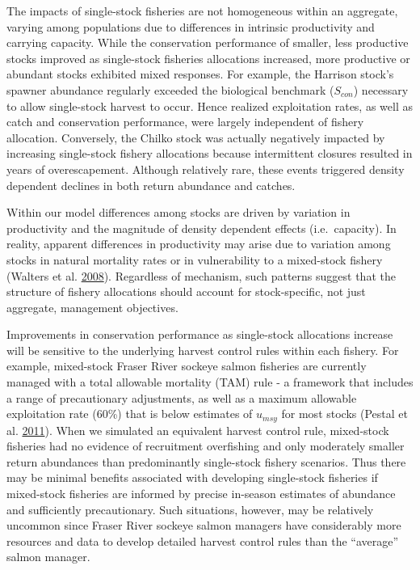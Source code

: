 \documentclass[11pt]{book}
\begin{document}
The impacts of single-stock fisheries are not homogeneous within an aggregate, varying among populations due to differences in intrinsic productivity and carrying capacity. While the conservation performance of smaller, less productive stocks improved as single-stock fisheries allocations increased, more productive or abundant stocks exhibited mixed responses. For example, the Harrison stock's spawner abundance regularly exceeded the biological benchmark (\(S_{con}\)) necessary to allow single-stock harvest to occur. Hence realized exploitation rates, as well as catch and conservation performance, were largely independent of fishery allocation. Conversely, the Chilko stock was actually negatively impacted by increasing single-stock fishery allocations because intermittent closures resulted in years of overescapement. Although relatively rare, these events triggered density dependent declines in both return abundance and catches.

Within our model differences among stocks are driven by variation in productivity and the magnitude of density dependent effects (i.e.~capacity). In reality, apparent differences in productivity may arise due to variation among stocks in natural mortality rates or in vulnerability to a mixed-stock fishery (Walters et al. \protect\hyperlink{ref-Walters2008}{2008}). Regardless of mechanism, such patterns suggest that the structure of fishery allocations should account for stock-specific, not just aggregate, management objectives.

Improvements in conservation performance as single-stock allocations increase will be sensitive to the underlying harvest control rules within each fishery. For example, mixed-stock Fraser River sockeye salmon fisheries are currently managed with a total allowable mortality (TAM) rule - a framework that includes a range of precautionary adjustments, as well as a maximum allowable exploitation rate (60\%) that is below estimates of \(u_{msy}\) for most stocks (Pestal et al. \protect\hyperlink{ref-Pestal2011}{2011}). When we simulated an equivalent harvest control rule, mixed-stock fisheries had no evidence of recruitment overfishing and only moderately smaller return abundances than predominantly single-stock fishery scenarios. Thus there may be minimal benefits associated with developing single-stock fisheries if mixed-stock fisheries are informed by precise in-season estimates of abundance and sufficiently precautionary. Such situations, however, may be relatively uncommon since Fraser River sockeye salmon managers have considerably more resources and data to develop detailed harvest control rules than the ``average'' salmon manager.
\end{document}
